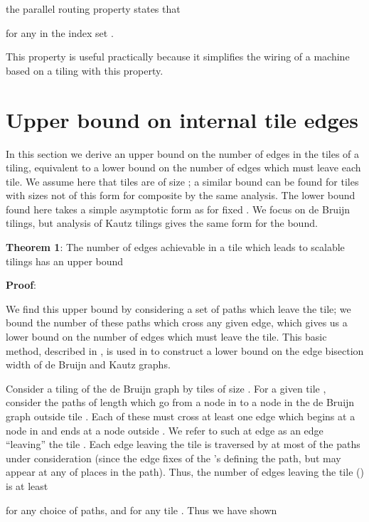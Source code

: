 \documentclass[12pt]{article}
\begin{document}
the parallel routing property states that

for any  in the index set .
\vspace*{0.1in}

This property is useful practically because it simplifies the wiring
of a machine based on a tiling with this property.  

\section{Upper bound on internal tile edges}
\label{sec:asymptotic}

In this section we derive an upper bound on the number of edges in the
tiles of a tiling, equivalent to a lower bound on the number of edges
which must leave each tile.  We assume here that tiles are of size ; a
similar bound can be found for tiles with sizes not of this form for
composite  by the same analysis.  The lower bound found here takes a simple
asymptotic form as  for fixed .  We focus on
de Bruijn tilings, but analysis of Kautz tilings gives the same form
for the bound.


\vspace*{0.1in}
\noindent
{\bf Theorem 1}: The number of edges achievable in a tile which
leads to scalable tilings has an upper bound


\vspace*{0.1in}
\noindent
{\bf Proof}:

We find this upper bound by considering a set of paths which leave the
tile; we bound the number of these paths which cross any given edge,
which gives us a lower bound on the number of edges which must leave
the tile.  This basic method, described in \cite{Leighton}, is used in
\cite{rttv} to construct a lower bound on the edge bisection width of
de Bruijn and Kautz graphs.


Consider a tiling of the de Bruijn graph  by tiles of
size .  For a given tile , consider the  paths
of length  which go from a node in  to a node in the de Bruijn
graph outside tile .  Each of these must cross at least one edge
which begins at a node in  and ends at a node outside .  We
refer to such at edge as an edge ``leaving'' the tile .  Each edge
leaving the tile is traversed by at most  of the paths
under consideration (since the edge fixes  of the  's
defining the path, but may appear at any of  places in the path).
Thus, the number of edges leaving the tile () is at
least

for any choice of paths, and for any tile .
Thus we have shown
\end{document}
